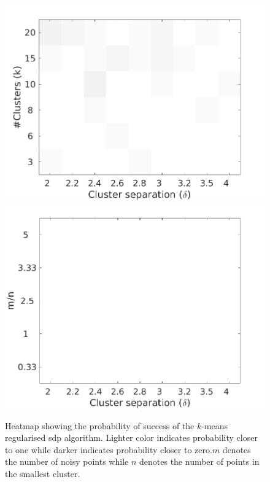 \begin{figure}
  \includegraphics[width=\textwidth]{figures/optimizationClustering/deltaK.png}
  \includegraphics[width=\textwidth]{figures/optimizationClustering/deltaM.png}
  \caption{Heatmap showing the probability of success of the $k$-means regularised sdp algorithm. Lighter color indicates probability closer to one while darker indicates probability closer to zero.$m$ denotes the number of noisy points while $n$ denotes the number of points in the smallest cluster.}
\end{figure}
